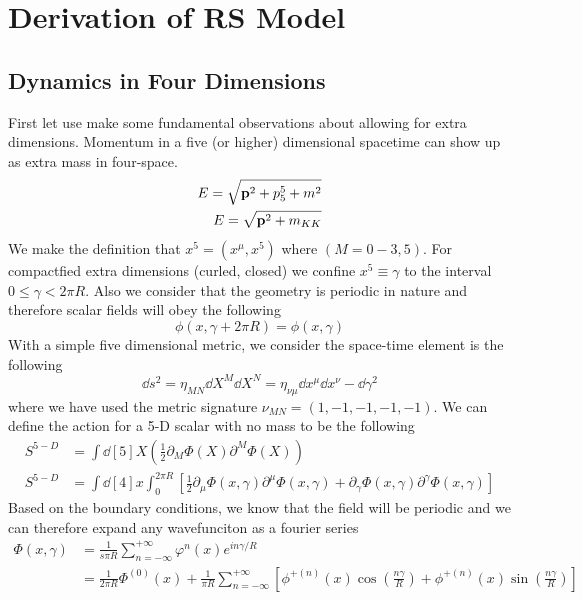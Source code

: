 \documentclass[12pt]{article}
\newcommand{\pd}{\partial}
\renewcommand{\vb}{\vectorbold}
\begin{document}
\clearpage
\newpage
\section{Derivation of RS Model}
\subsection{Dynamics in Four Dimensions}
First let use make some fundamental observations about allowing for extra
dimensions. Momentum in a five (or higher) dimensional spacetime can show up as
extra mass in four-space. 
\begin{align}
    E = \sqrt{\vb{p}^2 + p_5^5 + m^2} \\
    E = \sqrt{\vb{p}^2 + m_{KK}}
\end{align}
We make the definition that $x^5 = (x^\mu,x^5)$ where $(M = 0-3,5)$. For
compactfied extra dimensions (curled, closed) we confine $x^5 \equiv \gamma$ to
the interval $0 \leq \gamma < 2\pi R$. Also we consider that the geometry is
periodic in nature and therefore scalar fields will obey the following
\begin{equation}
    \phi(x, \gamma + 2\pi R) = \phi (x,\gamma)
\end{equation}
With a simple five dimensional metric, we consider the space-time element is the
following
\begin{equation}
    \dd{s}^2 = \eta_{MN}\dd{X}^M\dd{X}^N = \eta_{\nu\mu}\dd{x}^\mu\dd{x}^\nu -
    \dd{\gamma}^2
\end{equation}
where we have used the metric signature $\nu_{MN} = (1,-1,-1,-1,-1)$.
We can define the action for a 5-D scalar with no mass to be the following
\begin{align}
    S^{5-D} &= \int \dd[5]{X} \left( \frac{1}{2} \pd_M \Phi(X) \pd^M
    \Phi(X) \right) \\
        S^{5-D} &= \int \dd[4]{x} \int^{2\pi R}_{0} \left[ \frac{1}{2} \pd_\mu \Phi(x,\gamma) \pd^\mu
    \Phi(x,\gamma) + \pd_\gamma \Phi(x,\gamma) \pd^\gamma
    \Phi(x,\gamma) \right]
\end{align}
Based on the boundary conditions, we know that the field will be periodic and we
can therefore expand any wavefunciton as a fourier series
\begin{align}
    \Phi(x,\gamma) &= \frac{1}{s\pi R} \sum^{+\infty}_{n=-\infty}
    \varphi^{n}(x)e^{in\gamma /R} \\
                   &= \frac{1}{2\pi R} \Phi^{(0)}(x) + \frac{1}{\pi R}
                   \sum^{+\infty}_{n=-\infty} \left[
                       \phi^{+(n)}(x)\cos\left( \frac{n\gamma}{R} \right) +
               \phi^{+(n)}(x)\sin\left( \frac{n\gamma}{R} \right) \right]
\end{align}
\end{document}
